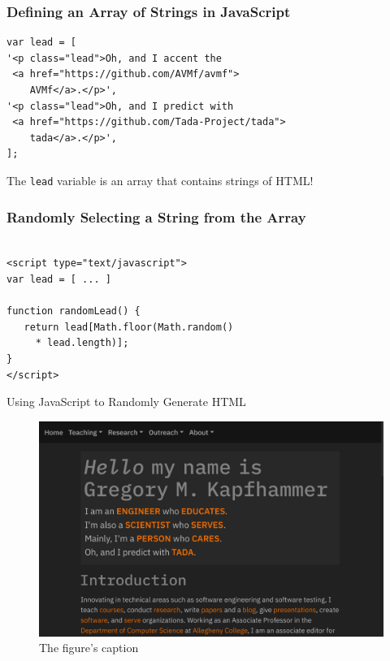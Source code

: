 \documentclass[14pt,aspectratio=169]{beamer}
\begin{document}
%
\begin{frame}[fragile]
  \frametitle{Defining an Array of Strings in JavaScript}
  \normalsize
  \begin{minipage}{6in}
    \vspace*{.2in}
    \begin{verbatim}
var lead = [
'<p class="lead">Oh, and I accent the
 <a href="https://github.com/AVMf/avmf">
    AVMf</a>.</p>',
'<p class="lead">Oh, and I predict with
 <a href="https://github.com/Tada-Project/tada">
    tada</a>.</p>',
];
    \end{verbatim}
  \end{minipage}
  \vspace*{.1in}
  \begin{center}
    The {\tt lead} variable is an array that contains strings of HTML!
  \end{center}
\end{frame}

%
\begin{frame}[fragile]
  \frametitle{Randomly Selecting a String from the Array}
  \normalsize
  \begin{minipage}{6in}
    \vspace*{.2in}
    \begin{verbatim}

<script type="text/javascript">
var lead = [ ... ]

function randomLead() {
   return lead[Math.floor(Math.random()
     * lead.length)];
}
</script>

    \end{verbatim}
  \end{minipage}
\end{frame}

%
\begin{frame}{Using JavaScript to Randomly Generate HTML}
  \begin{figure}
    \centering
    \includegraphics[scale=.085]{images/javascript-web-site.png}
    \caption{The figure's caption}
  \end{figure}
\end{frame}
\end{document}

